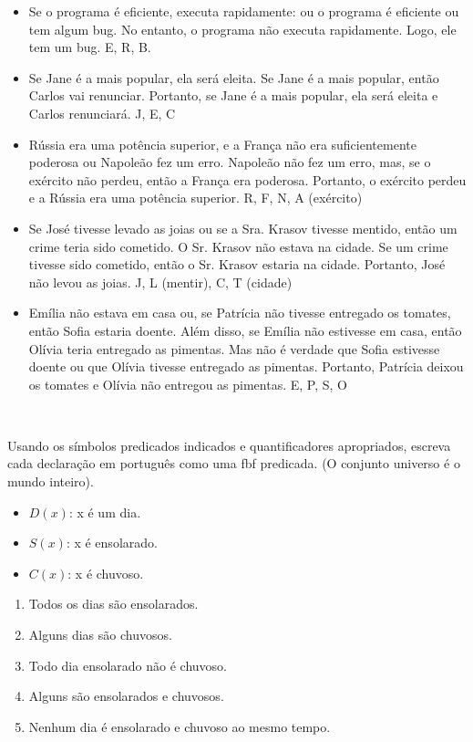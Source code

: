 \documentclass[a4paper, 12pt, addpoints]{exam}
\begin{document}
\begin{questions}
  \begin{itemize}
    \item Se o programa é eficiente, executa rapidamente: ou o programa é eficiente ou tem algum bug. No entanto, o programa não executa rapidamente. Logo, ele tem um bug. E, R, B.
    \item Se Jane é a mais popular, ela será eleita. Se Jane é a mais popular, então Carlos vai renunciar. Portanto, se Jane é a mais popular, ela será eleita e Carlos renunciará. J, E, C
    \item Rússia era uma potência superior, e a França não era suficientemente poderosa ou Napoleão fez um erro. Napoleão não fez um erro, mas, se o exército não perdeu, então a França era poderosa. Portanto, o exército perdeu e a Rússia era uma potência superior. R, F, N, A (exército)
    \item Se José tivesse levado as joias ou se a Sra. Krasov tivesse mentido, então um crime teria sido cometido. O Sr. Krasov não estava na cidade. Se um crime tivesse sido cometido, então o Sr. Krasov estaria na cidade. Portanto, José não levou as joias. J, L (mentir), C, T (cidade)
    \item Emília não estava em casa ou, se Patrícia não tivesse entregado os tomates, então Sofia estaria doente. Além disso, se Emília não estivesse em casa, então Olívia teria entregado as pimentas. Mas não é verdade que Sofia estivesse doente ou que Olívia tivesse entregado as pimentas. Portanto, Patrícia deixou os tomates e Olívia não entregou as pimentas. E, P, S, O
  \end{itemize}
  

  \begin{resp}~
 
  \end{resp}

  \question Usando os símbolos predicados indicados e quantificadores apropriados, escreva cada declaração em português como uma fbf predicada. (O conjunto universo é o mundo inteiro).

  \begin{itemize}
    \item $D(x)$: x é um dia.
    \item $S(x)$: x é ensolarado.
    \item $C(x)$: x é chuvoso.
  \end{itemize}

  \begin{enumerate}
    \item Todos os dias são ensolarados.
    \item Alguns dias são chuvosos.
    \item Todo dia ensolarado não é chuvoso.
    \item Alguns são ensolarados e chuvosos.
    \item Nenhum dia é ensolarado e chuvoso ao mesmo tempo.
  \end{enumerate}
  \begin{resp}~


\end{resp}
\end{questions}
\end{document}
